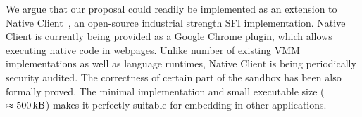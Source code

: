 We argue that our proposal could readily be implemented as an extension
to Native Client~\cite{yee:ieee-sp09}, an open-source industrial
strength SFI implementation. Native Client is currently being provided
as a Google Chrome plugin, which allows executing native code in
webpages. Unlike number of existing VMM implementations as well as
language runtimes, Native Client is being periodically security audited.
The correctness of certain part of the sandbox has been also formally
proved. The minimal implementation and small executable size
($\approx\SI{500}{\kilo\byte}$) makes it perfectly suitable for
embedding in other applications.










